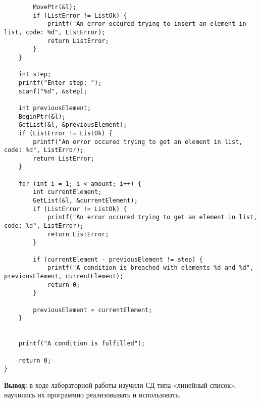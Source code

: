 \documentclass[a4paper,14pt]{extarticle}
\begin{document}
\begin{enumerate}
\begin{verbatim}
        MovePtr(&l);
        if (ListError != ListOk) {
            printf("An error occured trying to insert an element in list, code: %d", ListError);
            return ListError;
        }
    }
    
    int step;
    printf("Enter step: ");
    scanf("%d", &step);

    int previousElement;
    BeginPtr(&l);
    GetList(&l, &previousElement);
    if (ListError != ListOk) {
        printf("An error occured trying to get an element in list, code: %d", ListError);
        return ListError;
    }

    for (int i = 1; i < amount; i++) {
        int currentElement;
        GetList(&l, &currentElement);
        if (ListError != ListOk) {
            printf("An error occured trying to get an element in list, code: %d", ListError);
            return ListError;
        }

        if (currentElement - previousElement != step) {
            printf("A condition is breached with elements %d and %d", previousElement, currentElement);
            return 0;
        }

        previousElement = currentElement;
    }

    
    printf("A condition is fulfilled");

    return 0;
}
\end{verbatim}
\end{enumerate}
\textbf{Вывод: } в ходе лабораторной работы изучили СД типа «линейный список», 
научились их программно реализовывать и использовать.
\end{document}
